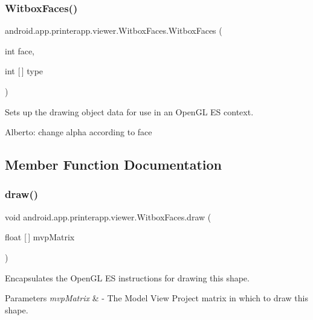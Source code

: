 \subsubsection{\texorpdfstring{Witbox\+Faces()}{WitboxFaces()}}
{\footnotesize\ttfamily android.\+app.\+printerapp.\+viewer.\+Witbox\+Faces.\+Witbox\+Faces (\begin{DoxyParamCaption}\item[{int}]{face,  }\item[{int \mbox{[}$\,$\mbox{]}}]{type }\end{DoxyParamCaption})}

Sets up the drawing object data for use in an Open\+GL ES context.

Alberto\+: change alpha according to face 

\subsection{Member Function Documentation}
\mbox{\label{classandroid_1_1app_1_1printerapp_1_1viewer_1_1_witbox_faces_a1c7f3835324871a97a8d03ed0ce497a6}} 
\subsubsection{\texorpdfstring{draw()}{draw()}}
{\footnotesize\ttfamily void android.\+app.\+printerapp.\+viewer.\+Witbox\+Faces.\+draw (\begin{DoxyParamCaption}\item[{float \mbox{[}$\,$\mbox{]}}]{mvp\+Matrix }\end{DoxyParamCaption})}

Encapsulates the Open\+GL ES instructions for drawing this shape.


\begin{DoxyParams}{Parameters}
{\em mvp\+Matrix} & -\/ The Model View Project matrix in which to draw this shape. \\
\hline
\end{DoxyParams}
\mbox{\label{classandroid_1_1app_1_1printerapp_1_1viewer_1_1_witbox_faces_a6b0a909c0b3dbb35abcadd32c8a10529}} 
